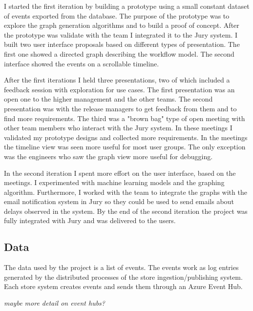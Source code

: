 \documentclass[english,12pt,a4paper,pdftex,sci,utf8]{aaltothesis}
\theoremstyle{definition}
\newcommand{\nyi}[1]{\noindent\colorbox{nyibg}{\textcolor{nyitext}{\emph{#1}}}}
\begin{document}
I started the first iteration by building a prototype using a small constant dataset of events exported from the database. The purpose of the prototype was to explore the graph generation algorithms and to build a proof of concept. After the prototype was validate with the team I integrated it to the Jury system. I built two user interface proposals based on different types of presentation. The first one showed a directed graph describing the workflow model. The second interface showed the events on a scrollable timeline.

After the first iterations I held three presentations, two of which included a feedback session with exploration for use cases. The first presentation was an open one to the higher management and the other teams. The second presentation was with the release managers to get feedback from them and to find more requirements. The third was a "brown bag" type of open meeting with other team members who interact with the Jury system.
In these meetings I validated my prototype designs and collected more requirements.
In the meetings the timeline view was seen more useful for most user groups.
The only exception was the engineers who saw the graph view more useful for debugging.

In the second iteration I spent more effort on the user interface, based on the meetings.
I experimented with machine learning models and the graphing algorithm.
Furthermore, I worked with the team to integrate the graphs with the email notification system in Jury so they could be used to send emails about delays observed in the system. 
By the end of the second iteration the project was fully integrated with Jury and was delivered to the users.

\subsection{Data}
The data used by the project is a list of events. The events work as log entries generated by the distributed processes of the store ingestion/publishing system. Each store system creates events and sends them through an Azure Event Hub. 

\nyi{maybe more detail on event hubs?}
\end{document}
